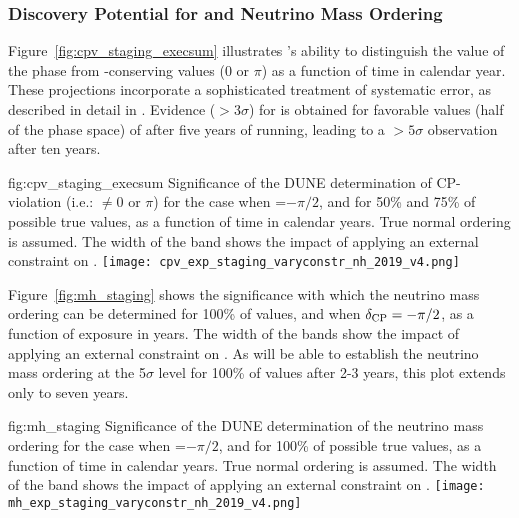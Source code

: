 \subsubsection{Discovery Potential for  and Neutrino 
Mass Ordering}

Figure~\ref{fig:cpv_staging_execsum} 
illustrates 's ability to distinguish 
the value of the  phase \deltacp from -conserving 
values (0 or $\pi$) as a function of time in calendar year.  
These projections incorporate a sophisticated treatment of systematic 
error, as described in detail in \physchlbl.  
Evidence ($>3\sigma$) for  is obtained for 
favorable values (half of the phase space) of \deltacp after five 
years of running, leading to a $>5\sigma$ %
observation after ten years.

\begin{dunefigure}{fig:cpv_staging_execsum}
{Significance of the DUNE determination of CP-violation (i.e.: \deltacp 
$\neq 0$ or $\pi$) for the case when \deltacp=$-\pi/2$, and for 50\% and 
75\% of possible true \deltacp values, as a function of time in calendar 
years. True normal ordering is assumed. The width of the band shows the 
impact of applying an external constraint on .}
\texttt{[image: cpv\_exp\_staging\_varyconstr\_nh\_2019\_v4.png]}
\end{dunefigure}

Figure~\ref{fig:mh_staging} shows the significance
with which the neutrino mass ordering can be determined for 100\% of \deltacp values, and when $\delta_{\rm CP}=-\pi/2$, as a function of exposure in years. The width of the bands show the impact of applying an external constraint on . As  will be able to establish the neutrino mass ordering at the 5$\sigma$ level for 100\% of \deltacp values after 2-3 years, this plot extends only to seven years.

\begin{dunefigure}
{fig:mh_staging}
{Significance of the DUNE determination of the neutrino mass ordering for the case when \deltacp=$-\pi/2$, and for 100\% of possible true \deltacp values, as a function of time in calendar years. True normal ordering is assumed. The width of the band shows the impact of applying an external constraint on .}
	\texttt{[image: mh\_exp\_staging\_varyconstr\_nh\_2019\_v4.png]}	
\end{dunefigure}


